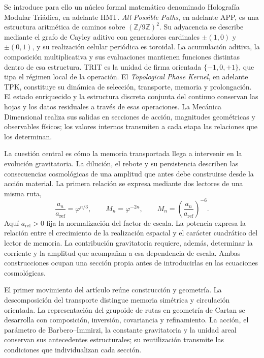 Se introduce para ello un núcleo formal matemático denominado Holografía
Modular Triádica, en adelante HMT. \emph{All Possible Paths}, en adelante
APP, es una estructura aritmética de caminos sobre
\((\mathbb Z/9\mathbb Z)^2\). Su adyacencia se describe mediante el grafo
de Cayley aditivo con generadores cardinales \(\pm(1,0)\) y
\(\pm(0,1)\), y su realización celular periódica es toroidal. La acumulación
aditiva, la composición multiplicativa y sus evaluaciones mantienen
funciones distintas dentro de esa estructura. TRIT es la unidad de firma
orientada \(\{-1,0,+1\}\), que tipa el régimen local de la operación.
El \emph{Topological Phase Kernel}, en adelante TPK, constituye su
dinámica de selección, transporte, memoria y prolongación. El estado
enriquecido y la estructura discreta conjunta del continuo conservan las
hojas y los datos residuales a través de esas operaciones. La Mecánica
Dimensional realiza sus salidas en secciones de acción, magnitudes
geométricas y observables físicos; los valores internos transmiten a
cada etapa las relaciones que los determinan.

La cuestión central es cómo la memoria transportada llega a intervenir
en la evolución gravitatoria. La dilución, el rebote y su persistencia
describen las consecuencias cosmológicas de una amplitud que antes debe
construirse desde la acción material. La primera relación se expresa
mediante dos lectores de una misma ruta,
\begin{equation}
 \frac{a_n}{a_{\mathrm{ref}}}=\varphi^{n/3},
 \qquad M_n=\varphi^{-2n},
 \qquad
 M_n=\left(\frac{a_n}{a_{\mathrm{ref}}}\right)^{-6}.
 \label{vii:eq:programa-dilucion}
\end{equation}
Aquí \(a_{\mathrm{ref}}>0\) fija la normalización del factor de escala.
La potencia expresa la relación entre el crecimiento de la realización
espacial y el carácter cuadrático del lector de memoria. La contribución
gravitatoria requiere, además, determinar la corriente y la amplitud que
acompañan a esa dependencia de escala. Ambas construcciones ocupan una
sección propia antes de introducirlas en las ecuaciones cosmológicas.

El primer movimiento del artículo reúne construcción y geometría. La
descomposición del transporte distingue memoria simétrica y circulación
orientada. La representación del grupoide de rutas en geometría de Cartan
se desarrolla con composición, inversión, covariancia y refinamiento. La
acción, el parámetro de Barbero--Immirzi, la constante gravitatoria y la
unidad areal conservan sus antecedentes estructurales; su reutilización
transmite las condiciones que individualizan cada sección.

